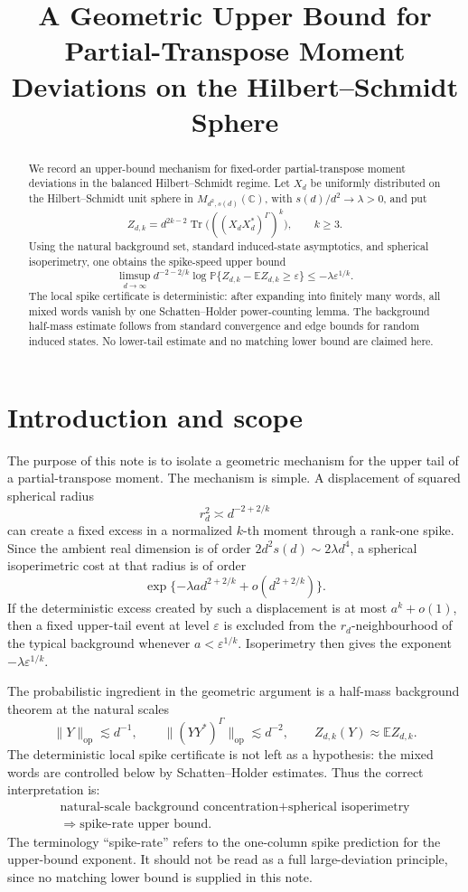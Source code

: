\documentclass[11pt]{article}
\title{A Geometric Upper Bound for Partial-Transpose Moment Deviations on the Hilbert--Schmidt Sphere}
\author{}
\date{}
\DeclareMathOperator{\Tr}{Tr}
\newcommand{\op}{\mathrm{op}}
\newcommand{\Prob}{\mathbb P}
\newcommand{\E}{\mathbb E}
\newcommand{\C}{\mathbb C}
\newcommand{\eps}{\varepsilon}
\begin{document}
\maketitle

\begin{abstract}
We record an upper-bound mechanism for fixed-order partial-transpose moment deviations in the balanced Hilbert--Schmidt regime.  Let $X_d$ be uniformly distributed on the Hilbert--Schmidt unit sphere in $M_{d^2,s(d)}(\C)$, with $s(d)/d^2\to \lambda>0$, and put
\[
  Z_{d,k}=d^{2k-2}\Tr\bigl(((X_dX_d^*)^\Gamma)^k\bigr),
  \qquad k\ge 3.
\]
Using the natural background set, standard induced-state asymptotics, and
spherical isoperimetry, one obtains the spike-speed upper bound
\[
  \limsup_{d\to\infty}d^{-2-2/k}\log\Prob\{Z_{d,k}-\E Z_{d,k}\ge \eps\}
  \le -\lambda \eps^{1/k} .
\]
The local spike certificate is deterministic: after expanding into finitely
many words, all mixed words vanish by one Schatten--Holder power-counting
lemma.  The background half-mass estimate follows from standard convergence
and edge bounds for random induced states.  No lower-tail estimate and no
matching lower bound are claimed here.
\end{abstract}

\section{Introduction and scope}

The purpose of this note is to isolate a geometric mechanism for the upper tail of a partial-transpose moment.  The mechanism is simple.  A displacement of squared spherical radius
\[
  r_d^2\asymp d^{-2+2/k}
\]
can create a fixed excess in a normalized $k$-th moment through a rank-one spike.  Since the ambient real dimension is of order $2d^2s(d)\sim 2\lambda d^4$, a spherical isoperimetric cost at that radius is of order
\[
  \exp\{-\lambda a d^{2+2/k}+o(d^{2+2/k})\}.
\]
If the deterministic excess created by such a displacement is at most $a^k+o(1)$, then a fixed upper-tail event at level $\eps$ is excluded from the $r_d$-neighbourhood of the typical background whenever $a<\eps^{1/k}$.  Isoperimetry then gives the exponent $-\lambda\eps^{1/k}$.

The probabilistic ingredient in the geometric argument is a half-mass
background theorem at the natural scales
\[
  \|Y\|_{\op}\lesssim d^{-1},
  \qquad
  \|(YY^*)^\Gamma\|_{\op}\lesssim d^{-2},
  \qquad
  Z_{d,k}(Y)\approx \E Z_{d,k}.
\]
The deterministic local spike certificate is not left as a hypothesis: the
mixed words are controlled below by Schatten--Holder estimates.  Thus the
correct interpretation is:
\[
\begin{gathered}
  \text{natural-scale background concentration} + \text{spherical isoperimetry} \\
  \Longrightarrow \text{spike-rate upper bound}.
\end{gathered}
\]
The terminology ``spike-rate'' refers to the one-column spike prediction for
the upper-bound exponent.  It should not be read as a full large-deviation
principle, since no matching lower bound is supplied in this note.
\end{document}
